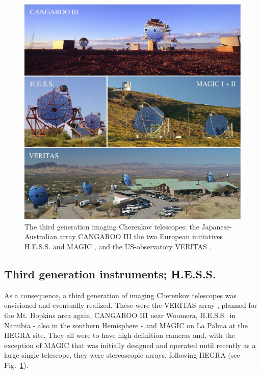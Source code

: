 \documentclass{svjour3x}                     %
\newcommand{\hess}{H.E.S.S.}
\begin{document}
\begin{figure}%
  \includegraphics[width=\textwidth]{TelescopeSystems_x.eps}
  \caption[Third generation IACTs]{The third generation imaging Cherenkov telescopes: 
   the Japanese-Australian array CANGAROO III \cite{cangaroopic}
   the two European initiatives H.E.S.S. \cite{hesspic}
   and MAGIC \cite{magicpic}, 
   and the US-observatory VERITAS \cite{veritaspic}.}
  \label{fig:11}       %
\end{figure}
%

\subsection {Third generation instruments; \hess}

As a consequence, a third generation of imaging Cherenkov telescopes was
envisioned and eventually realized. These were the VERITAS array
\cite{veritas03}, planned for the Mt. Hopkins area again, CANGAROO III
\cite{mori05} near Woomera, \hess\ in Namibia \cite{benbow05} - also in the
southern Hemisphere - and MAGIC \cite{lorenz05} on La Palma at the HEGRA site.
They all were to have high-definition cameras and, with the exception of MAGIC
that was initially designed and operated until recently as a large single
telescope, they were stereoscopic arrays, following HEGRA (see
Fig.~\ref{fig:11}).
\end{document}
